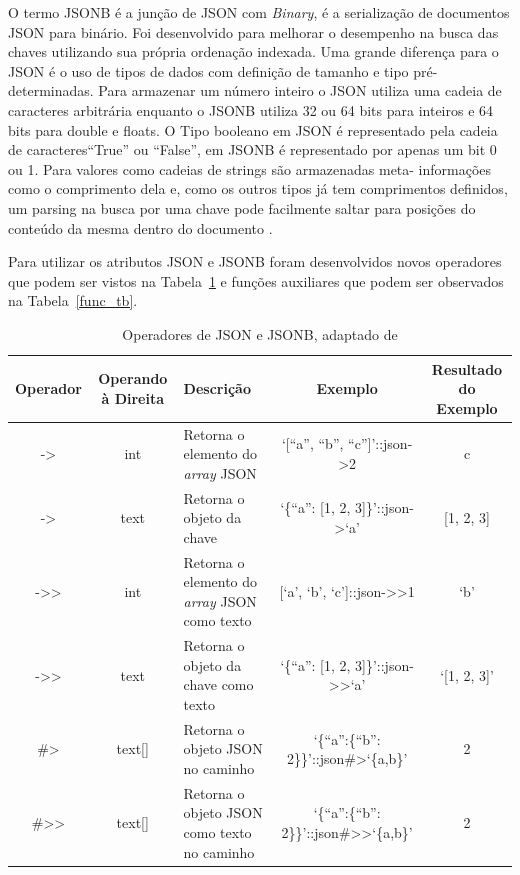 \documentclass[article,11pt,oneside,a4paper]{abntex2} %
\begin{document}
	O termo JSONB é a junção de JSON com \textit{Binary}, é a serialização de documentos JSON para binário. Foi desenvolvido para melhorar o desempenho na busca das chaves utilizando sua própria ordenação indexada. Uma grande diferença para o JSON é o uso de tipos de dados com definição de tamanho e tipo pré-determinadas. Para armazenar um número inteiro o JSON utiliza uma cadeia de caracteres arbitrária enquanto o JSONB utiliza 32 ou 64 bits para inteiros e 64 bits para double e floats. O Tipo booleano em JSON é representado pela cadeia de caracteres``True'' ou ``False'', em JSONB é representado por apenas um bit 0 ou 1. Para valores como cadeias de strings são armazenadas meta- informações como o comprimento dela e, como os outros tipos já tem comprimentos definidos, um parsing na busca por uma chave pode facilmente saltar para posições do conteúdo da mesma dentro do documento \cite{postgresql}.
	
	Para utilizar os atributos JSON e JSONB foram desenvolvidos novos operadores que podem ser vistos na Tabela~\ref{json_tb} e funções auxiliares que podem ser observados na Tabela~\ref{func_tb}.
	
	\begin{table}[h!]
		\centering
		\caption{Operadores de JSON e JSONB, adaptado de \cite{postgresql}}
		\label{json_tb}
		\begin{adjustbox}{max width=\textwidth}
		\begin{tabular}{|c|c|p{5cm}|c|c|}
			\hline
			Operador & Operando à Direita & Descrição & Exemplo & Resultado do Exemplo 
			\\ \hline
			-\textgreater & int & Retorna o elemento do \textit{array} JSON & `[``a'', ``b'', ``c'']'::json-\textgreater2 & c
			\\ \hline
			-\textgreater & text & Retorna o objeto da chave & `\{``a'': [1, 2, 3]\}'::json-\textgreater`a' & [1, 2, 3]
			\\ \hline
			-\textgreater\textgreater & int & Retorna o elemento do \textit{array} JSON como texto & [`a', `b', `c']::json-\textgreater\textgreater1 & `b'
			\\ \hline
			-\textgreater\textgreater & text & Retorna o objeto da chave como texto & `\{``a'': [1, 2, 3]\}'::json-\textgreater\textgreater`a' & `[1, 2, 3]'
			\\ \hline
			\#\textgreater & text[] & Retorna o objeto JSON no caminho & `\{``a'':\{``b'': 2\}\}'::json\#\textgreater`\{a,b\}' & 2
			\\ \hline
			\#\textgreater\textgreater & text[] & Retorna o objeto JSON como texto no caminho & `\{``a'':\{``b'': 2\}\}'::json\#\textgreater\textgreater`\{a,b\}' & 2
			\\ \hline
			
		\end{tabular}
		\end{adjustbox}
	\end{table}
\end{document}
